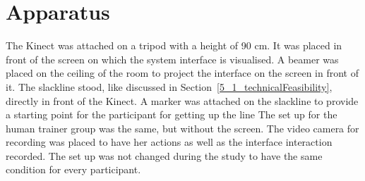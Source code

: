 \section{Apparatus}
The Kinect was attached on a tripod with a height of 90 cm. It was placed in front of the screen on which the system interface is visualised. A beamer was placed on the ceiling of the room to project the interface on the screen in front of it. The slackline stood, like discussed in Section~\ref{5_1_technicalFeasibility}, directly in front of the Kinect. A marker was attached on the slackline to provide a starting point for the participant for getting up the line
The set up for the human trainer group was the same, but without the screen. The video camera for recording was placed  to have her actions as well as the interface interaction recorded. The set up was not changed during the study to have the same condition for every participant.


